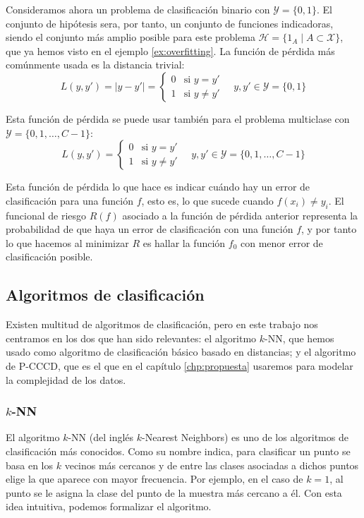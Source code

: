 \documentclass[a4paper,12pt]{report}
\theoremstyle{definition}
\begin{document}
Consideramos ahora un problema de clasificación binario con $\mathcal{Y} = \lbrace 0, 1 \rbrace$. El conjunto de hipótesis sera, por tanto, un conjunto de funciones indicadoras, siendo el conjunto más amplio posible para este problema $\mathcal{H} = \lbrace 1_A \mid A \subset \mathcal{X} \rbrace$, que ya hemos visto en el ejemplo \ref{ex:overfitting}.
La función de pérdida más comúnmente usada es la distancia trivial:
$$ L(y, y') = \lvert y - y' \rvert = \begin{cases}
  0 & \text{si } y = y'\\
  1 & \text{si } y \neq y'
\end{cases} \quad y, y' \in \mathcal{Y} = \lbrace0, 1 \rbrace$$

Esta función de pérdida se puede usar también para el problema multiclase con $\mathcal{Y} = \lbrace 0, 1, \ldots, C-1 \rbrace$:
$$ L(y, y') = \begin{cases}
  0 & \text{si } y = y'\\
  1 & \text{si } y \neq y'
\end{cases} \quad y, y' \in \mathcal{Y} = \lbrace0, 1, \ldots, C-1 \rbrace$$

Esta función de pérdida lo que hace es indicar cuándo hay un error de clasificación para una función $f$, esto es, lo que sucede cuando $f(x_i) \neq y_i$. El funcional de riesgo $R(f)$ asociado a la función de pérdida anterior representa la probabilidad de que haya un error de clasificación con una función $f$, y por tanto lo que hacemos al minimizar $R$ es hallar la función $f_0$ con menor error de clasificación posible.

\subsection{Algoritmos de clasificación}
\label{subsec:algs}

Existen multitud de algoritmos de clasificación, pero en este trabajo nos centramos en los dos que han sido relevantes: el algoritmo $k$-NN, que hemos usado como algoritmo de clasificación básico basado en distancias; y el algoritmo de P-CCCD, que es el que en el capítulo \ref{chp:propuesta} usaremos para modelar la complejidad de los datos.

\subsubsection{$k$-NN}
El algoritmo $k$-NN (del inglés $k$-Nearest Neighbors) es uno de los algoritmos de clasificación más conocidos. Como su nombre indica, para clasificar un punto se basa en los $k$ vecinos más cercanos y de entre las clases asociadas a dichos puntos elige la que aparece con mayor frecuencia. Por ejemplo, en el caso de $k = 1$, al punto se le asigna la clase del punto de la muestra más cercano a él. Con esta idea intuitiva, podemos formalizar el algoritmo.
\end{document}
